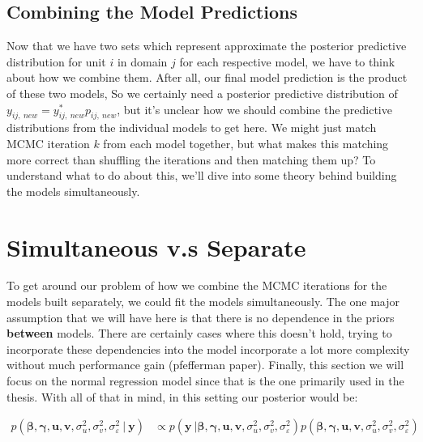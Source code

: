 \documentclass[12pt,twoside]{reedthesis}
\begin{document}
\hypertarget{combining-the-model-predictions}{%
\subsection{Combining the Model Predictions}\label{combining-the-model-predictions}}

Now that we have two sets which represent approximate the posterior predictive distribution for unit \(i\) in domain \(j\) for each respective model, we have to think about how we combine them. After all, our final model prediction is the product of these two models, So we certainly need a posterior predictive distribution of \(y_{ij, \ new} = y_{ij, \ new}^*p_{ij, \ new}\), but it's unclear how we should combine the predictive distributions from the individual models to get here. We might just match MCMC iteration \(k\) from each model together, but what makes this matching more correct than shuffling the iterations and then matching them up? To understand what to do about this, we'll dive into some theory behind building the models simultaneously.

\hypertarget{simultaneous-v.s-separate}{%
\section{Simultaneous v.s Separate}\label{simultaneous-v.s-separate}}

To get around our problem of how we combine the MCMC iterations for the models built separately, we could fit the models simultaneously. The one major assumption that we will have here is that there is no dependence in the priors \textbf{between} models. There are certainly cases where this doesn't hold, trying to incorporate these dependencies into the model incorporate a lot more complexity without much performance gain (pfefferman paper). Finally, this section we will focus on the normal regression model since that is the one primarily used in the thesis. With all of that in mind, in this setting our posterior would be:

\[
\begin{aligned}
p(\boldsymbol{\beta}, \boldsymbol{\gamma}, \mathbf{u}, \mathbf{v}, \sigma_u^2, \sigma_v^2, \sigma_{\varepsilon}^2\ | \ \mathbf{y}) &\propto p(\mathbf{y} \ | \boldsymbol{\beta}, \boldsymbol{\gamma}, \mathbf{u}, \mathbf{v}, \sigma_u^2, \sigma_v^2, \sigma_{\varepsilon}^2)p(\boldsymbol{\beta}, \boldsymbol{\gamma}, \mathbf{u}, \mathbf{v}, \sigma_u^2, \sigma_v^2, \sigma_{\varepsilon}^2) 
\end{aligned}
\]
\end{document}
